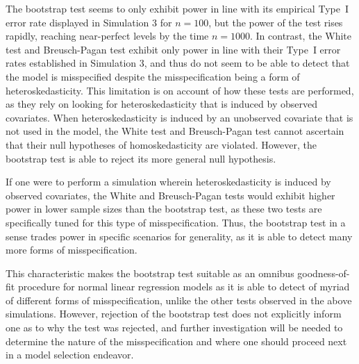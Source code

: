 		The bootstrap test seems to only exhibit power in line with its empirical Type~I error rate displayed in Simulation 3 for $n = 100$, but the power of the test rises
		rapidly, reaching near-perfect levels by the time $n = 1000$. In contrast, the White test and Breusch-Pagan test exhibit only power in line with their Type~I error
		rates established in Simulation 3, and thus do not seem to be able to detect that the model is misspecified despite the misspecification being a form of
		heteroskedasticity. This limitation is on account of how these tests are performed, as they rely on looking for heteroskedasticity that is induced by observed covariates.
		When heteroskedasticity is induced by an unobserved covariate that is not used in the model, the White test and Breusch-Pagan test cannot ascertain that their
		null hypotheses of homoskedasticity are violated. However, the bootstrap test is able to reject its more general null hypothesis.

		If one were to perform a simulation wherein heteroskedasticity is induced by observed covariates, the White and Breusch-Pagan tests would exhibit higher power in lower
		sample sizes than the bootstrap test, as these two tests are specifically tuned for this type of misspecification. Thus, the bootstrap test in a sense trades power in specific
		scenarios for generality, as it is able to detect many more forms of misspecification.
		
		This characteristic makes the bootstrap test suitable as an omnibus goodness-of-fit procedure for normal linear regression models as it is able to detect of myriad of different
		forms of misspecification, unlike the other tests observed in the above simulations. However, rejection of the bootstrap test does not explicitly inform one as to why the test
		was rejected, and further investigation will be needed to determine the nature of the misspecification and where one should proceed next in a model selection endeavor.



